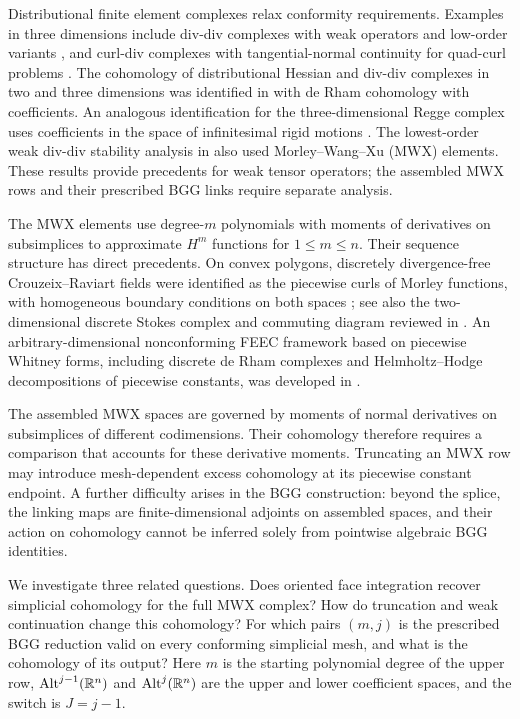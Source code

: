 \documentclass[10pt]{amsart}
\numberwithin{equation}{section}
\begin{document}
Distributional finite element complexes relax conformity requirements.
Examples in three dimensions include div-div complexes with weak operators
and low-order variants \cite[Section~5.2]{ChenHuang2025}, and curl-div
complexes with tangential-normal continuity for quad-curl problems
\cite{ChenHuangZhang2025CurlDiv}.
The cohomology of distributional Hessian and div-div complexes in two
and three dimensions was identified in \cite{HuLinZhang2025} with de Rham
cohomology with coefficients. An analogous identification for
the three-dimensional Regge complex uses coefficients in the space of
infinitesimal rigid motions \cite{ChristiansenHuLin2026}.
The lowest-order weak div-div stability analysis in
\cite[Theorem~4.2]{ChenHuang2025} also used Morley--Wang--Xu (MWX) elements.
These results provide precedents for weak tensor operators; the assembled
MWX rows and their prescribed BGG links require separate analysis.

The MWX elements \cite{WangXu2006,WangXu2013} use degree-$m$ polynomials
with moments of derivatives on subsimplices to approximate $H^m$ functions
for $1\leq m\leq n$. Their sequence structure has direct precedents.
On convex polygons, discretely divergence-free Crouzeix--Raviart fields
were identified as the piecewise curls of Morley functions, with
homogeneous boundary conditions on both spaces
\cite[Theorem~4.1]{FalkMorley1990};
see also the two-dimensional discrete Stokes complex and commuting diagram
reviewed in \cite[Section~3.1.2]{Brenner2015}.
An arbitrary-dimensional nonconforming FEEC framework based on piecewise
Whitney forms, including discrete de Rham complexes and Helmholtz--Hodge
decompositions of piecewise constants, was developed in
\cite{ZhangNCFEEC2026}.

The assembled MWX spaces are governed by moments of normal derivatives on
subsimplices of different codimensions. Their cohomology therefore
requires a comparison that accounts for these derivative moments.
Truncating an MWX row may introduce mesh-dependent excess cohomology at
its piecewise constant endpoint. A further difficulty arises in the BGG
construction: beyond the splice, the linking maps are finite-dimensional
adjoints on assembled spaces, and their action on cohomology cannot be
inferred solely from pointwise algebraic BGG identities.

We investigate three related questions. Does oriented face integration
recover simplicial cohomology for the full MWX complex? How do truncation
and weak continuation change this cohomology? For which pairs $(m,j)$ is
the prescribed BGG reduction valid on every conforming simplicial mesh,
and what is the cohomology of its output?
Here $m$ is the starting polynomial degree of the upper row,
${\rm Alt}^{j-1}(\mathbb R^n)$ and ${\rm Alt}^{j}(\mathbb R^n)$ are the
upper and lower coefficient spaces, and the switch is $J=j-1$.
\end{document}
